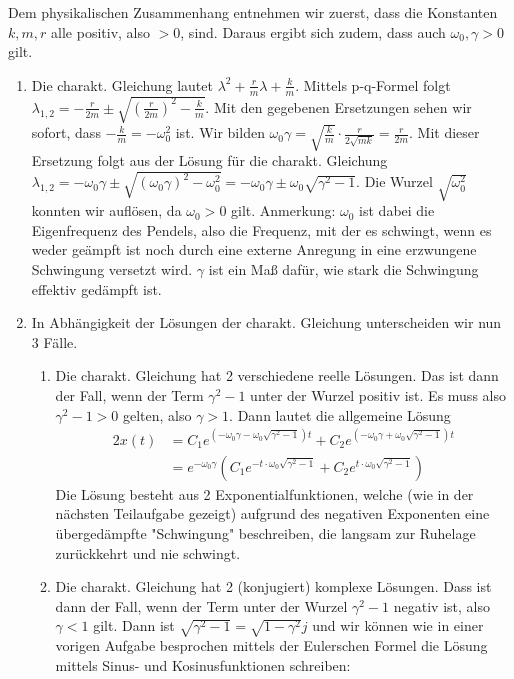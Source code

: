 \item Dem physikalischen Zusammenhang entnehmen wir zuerst, dass die Konstanten $k,m,r$ alle positiv, also $>0$, sind. Daraus ergibt sich zudem, dass auch $\omega_0,\gamma>0$ gilt.

\begin{enumerate}
	\item Die charakt. Gleichung lautet $\lambda^2+\frac{r}{m}\lambda+\frac{k}{m}$. Mittels p-q-Formel folgt $\lambda_{1,2} = -\frac{r}{2m} \pm \sqrt{\left(\frac{r}{2m}\right)^2 - \frac{k}{m}}$. Mit den gegebenen Ersetzungen sehen wir sofort, dass $- \frac{k}{m} = - \omega_0^2$ ist. Wir bilden $\omega_0\gamma = \sqrt{\frac{k}{m}} \cdot \frac{r}{2\sqrt{mk}} = \frac{r}{2m}$. Mit dieser Ersetzung folgt aus der Lösung für die charakt. Gleichung $\lambda_{1,2} = -\omega_0\gamma \pm \sqrt{(\omega_0\gamma)^2-\omega_0^2} = -\omega_0\gamma \pm \omega_0 \sqrt{\gamma^2-1}$. Die Wurzel $\sqrt{\omega_0^2}$ konnten wir auflösen, da $\omega_0>0$ gilt. Anmerkung: $\omega_0$ ist dabei die Eigenfrequenz des Pendels, also die Frequenz, mit der es schwingt, wenn es weder geämpft ist noch durch eine externe Anregung in eine erzwungene Schwingung versetzt wird. $\gamma$ ist ein Maß dafür, wie stark die Schwingung effektiv gedämpft ist.
	\item In Abhängigkeit der Lösungen der charakt. Gleichung unterscheiden wir nun 3 Fälle.
	\begin{enumerate}
		\item Die charakt. Gleichung hat 2 verschiedene reelle Lösungen. Das ist dann der Fall, wenn der Term $\gamma^2-1$ unter der Wurzel positiv ist. Es muss also $\gamma^2-1 > 0$ gelten, also $\gamma>1$. Dann lautet die allgemeine Lösung 
		\begin{alignat*}{2}
			x(t) &= C_1 e^{\left(-\omega_0\gamma - \omega_0\sqrt{\gamma^2-1}\right)t} + C_2 e^{\left(-\omega_0\gamma + \omega_0 \sqrt{\gamma^2-1}\right)t} \\
			     &= e^{-\omega_0\gamma } \left( C_1 e^{-t \cdot \omega_0\sqrt{\gamma^2-1}} + C_2 e^{t \cdot \omega_0\sqrt{\gamma^2-1}} \right)
		\end{alignat*}
		Die Lösung besteht aus 2 Exponentialfunktionen, welche (wie in der nächsten Teilaufgabe gezeigt) aufgrund des negativen Exponenten eine übergedämpfte "Schwingung" beschreiben, die langsam zur Ruhelage zurückkehrt und nie schwingt.
		\item Die charakt. Gleichung hat 2 (konjugiert) komplexe Lösungen. Dass ist dann der Fall, wenn der Term unter der Wurzel $\gamma^2-1$ negativ ist, also $\gamma<1$ gilt. Dann ist $\sqrt{\gamma^2-1} = \sqrt{1-\gamma^2}j$ und wir können wie in einer vorigen Aufgabe besprochen mittels der Eulerschen Formel die Lösung mittels Sinus- und Kosinusfunktionen schreiben:

\end{enumerate}
\end{enumerate}
